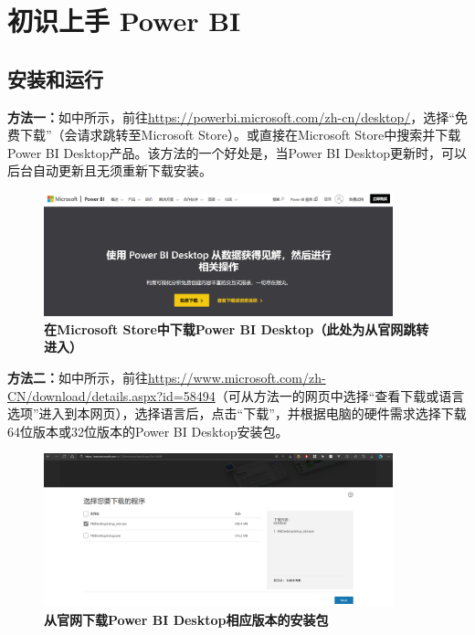 \section{初识上手 Power BI}

\subsection{安装和运行}

\textbf{方法一：}如中所示，前往\url{https://powerbi.microsoft.com/zh-cn/desktop/}，选择``免费下载''（会请求跳转至Microsoft Store）。或直接在Microsoft Store中搜索并下载Power BI Desktop产品。该方法的一个好处是，当Power BI Desktop更新时，可以后台自动更新且无须重新下载安装。

\begin{figure}[htbp]
    \centering
    \includegraphics[width=0.9\textwidth]{figure/PowerBI/download_powerbi.png}
    \caption{\textbf{在Microsoft Store中下载Power BI Desktop（此处为从官网跳转进入）}}
    \label{fig:download_powerbi}
\end{figure}

\textbf{方法二：}如中所示，前往\url{https://www.microsoft.com/zh-CN/download/details.aspx?id=58494}（可从方法一的网页中选择``查看下载或语言选项''进入到本网页），选择语言后，点击``下载''，并根据电脑的硬件需求选择下载64位版本或32位版本的Power BI Desktop安装包。

\begin{figure}[htbp]
    \centering
    \includegraphics[width=0.9\textwidth]{figure/PowerBI/download_powerbi_web.png}
    \caption{\textbf{从官网下载Power BI Desktop相应版本的安装包}}
    \label{fig:download_powerbi_web}
\end{figure}

